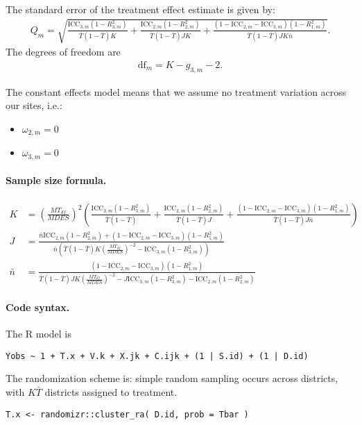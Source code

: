 \documentclass[12pt]{article}
\begin{document}
The standard error of the treatment effect estimate is given by:
\begin{align}
Q_m = \sqrt{
\frac{\text{ICC}_{3,m}(1 - R^2_{3,m})}{\bar{T}(1 - \bar{T}) K} +
\frac{\text{ICC}_{2,m}(1 - R^2_{2,m})}{\bar{T}(1 - \bar{T}) J K } +
\frac{(1-\text{ICC}_{2,m} - \text{ICC}_{3,m})(1-R^2_{1,m})}{\bar{T}(1 - \bar{T}) J K\bar{n}} }.\end{align}
The degrees of freedom are
\begin{align}\text{df}_m = K - g_{3,m} - 2.\end{align}


The constant effects model means that we assume no treatment variation across our sites, i.e.:
\begin{itemize}
\item $\omega_{2,m} = 0$
\item $\omega_{3,m} = 0$
\end{itemize}



\paragraph{Sample size formula.} 
\begin{align}
K &= \left(\frac{MT_{df}}{MDES}\right)^2 \left( \frac{\text{ICC}_{3,m}(1-R_{3,m}^2)}{\bar{T}(1 - \bar{T})}  + \frac{\text{ICC}_{2,m} (1-R_{2,m}^2)}{\bar{T}(1 - \bar{T}) J} + \frac{(1-\text{ICC}_{2,m}-\text{ICC}_{3,m})(1-R^2_{1,m})}{\bar{T}(1 - \bar{T}) J \bar{n}} \right)\\
J&=   \frac{\bar{n}\text{ICC}_{2,m} (1-R_{2,m}^2) + (1-\text{ICC}_{2,m}-\text{ICC}_{3,m})(1-R^2_{1,m})}{\bar{n}\left(\bar{T}(1 - \bar{T}) K \left(\frac{MT_{df}}{MDES}\right)^{-2} - \text{ICC}_{3,m}(1-R_{3,m}^2)\right)} \\
\bar{n} &= \frac{(1-\text{ICC}_{2,m}-\text{ICC}_{3,m})(1-R^2_{1,m})}{\bar{T}(1 - \bar{T})JK \left(\frac{MT_{df}}{MDES}\right)^{-2} - J\text{ICC}_{3,m}(1-R_{3,m}^2) - \text{ICC}_{2,m} (1-R_{2,m}^2)}
\end{align}

\paragraph{Code syntax.}
The R model is
\begin{verbatim}
Yobs ~ 1 + T.x + V.k + X.jk + C.ijk + (1 | S.id) + (1 | D.id)
\end{verbatim}

The randomization scheme is: simple random sampling occurs across districts, with $K\bar{T}$ districts assigned to treatment.
\begin{verbatim}
T.x <- randomizr::cluster_ra( D.id, prob = Tbar )
\end{verbatim}
\end{document}
